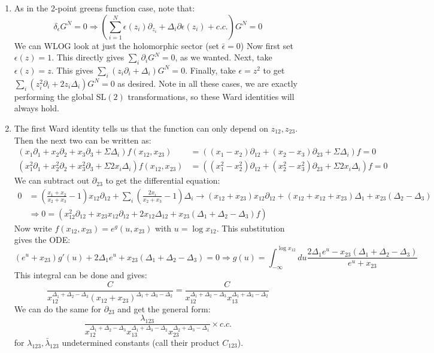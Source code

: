\documentclass[11pt]{article}
\begin{document}
\begin{enumerate}
	\item As in the 2-point greens function case, note that:
	\[
		\delta_{\epsilon} G^N = 0 \Rightarrow \left(\sum_{i=1}^N \epsilon(z_i) \partial_{z_i} + \Delta_i \partial \epsilon(z_i) + c.c. \right) G^N = 0
	\]
	We can WLOG look at just the holomorphic sector (set $\bar \epsilon = 0$) Now first set $\epsilon(z) = 1$. This directly gives $\sum_{i} \partial_i G^N = 0$, as we wanted. Next, take $\epsilon(z)= z$. This gives $\sum_{i} (z_i \partial_i + \Delta_i) G^N = 0$. Finally, take $\epsilon = z^2$ to get $\sum_i (z^2_i \partial_i + 2 z_i \Delta_i) G^N = 0$ as desired. 
	Note in all these cases, we are exactly performing the global $\mathrm{SL}(2)$ transformations, so these Ward identities will always hold. 
	
	\item The first Ward identity tells us that the function can only depend on $z_{12}, z_{23}$. Then the next two can be written as:
	\[
		\begin{aligned}
			(x_1 \partial_1 + x_2 \partial_2 + x_3 \partial_3 + \Sigma \Delta_i) f(x_{12}, x_{23}) &= \left( (x_1 - x_2) \partial_{12} + (x_2 - x_3) \partial_{23} + \Sigma \Delta_i \right) f = 0\\
			(x_1^2 \partial_1 + x_2^2 \partial_2 + x_3^2 \partial_3 + \Sigma 2 x_i \Delta_i) f(x_{12}, x_{23}) &= \left( (x_1^2 - x_2^2) \partial_{12} + (x_2^2 - x_3^2) \partial_{23} + \Sigma 2 x_i \Delta_i \right) f = 0
		\end{aligned}
	\]
	We can subtract out $\partial_{23}$ to get the differential equation:
	\[
	\begin{aligned}
		0 &= \left( \frac{x_1 + x_2}{x_2 + x_3} - 1 \right) x_{12} \partial_{12} + \sum_i \left( \frac{2 x_i}{x_2 + x_3} - 1 \right) \Delta_i \to (x_{12} + x_{23}) x_{12} \partial_{12} + (x_{12} + x_{12} + x_{23}) \Delta_1  + x_{23} (\Delta_2 - \Delta_3)\\
		& \Rightarrow 0 = \left(x_{12}^2 \partial_{12} + x_{23} x_{12} \partial_{12} + 2 x_{12} \Delta_{12} + x_{23} (\Delta_1 + \Delta_2 - \Delta_3) f \right)
	\end{aligned}
	\]
	Now write $f(x_{12}, x_{23}) = e^g(u, x_{23})$ with $u = \log x_12$. This substitution gives the ODE:
	\[
		(e^u + x_{23}) g'(u) + 2 \Delta_1 e^u + x_{23} (\Delta_1 + \Delta_2 - \Delta_3) = 0 \Rightarrow g(u) = \int_{-\infty}^{\log{x_{12}}} du \frac{2 \Delta_1 e^u - x_{23} (\Delta_1 + \Delta_2 - \Delta_3)}{e^{u} + x_{23}}
	\]
	This integral can be done and gives:
	\[
		\frac{C}{x_{12}^{\Delta_1 + \Delta_2 - \Delta_3} (x_{12} + x_{23})^{\Delta_1 + \Delta_3 - \Delta_2}} = \frac{C}{x_{12}^{\Delta_1 + \Delta_2 - \Delta_3} x_{13}^{\Delta_1 + \Delta_3 - \Delta_2}} 
	\]
	We can do the same for $\partial_{23}$ and get the general form:
	\[
		\frac{\lambda_{123}}{x_{12}^{\Delta_1 + \Delta_2 - \Delta_3} x_{13}^{\Delta_1 + \Delta_3 - \Delta_2} x_{23}^{\Delta_2 + \Delta_3 - \Delta_1}} \times c.c.
	\]
	for $\lambda_{123}, \bar \lambda_{123}$ undetermined constants (call their product $C_{123}$). 
	

\end{enumerate}
\end{document}
